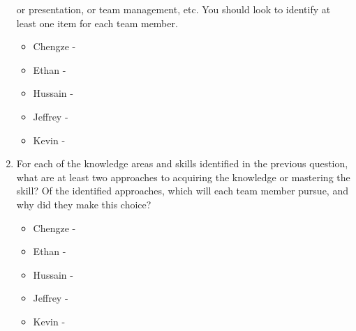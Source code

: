 \begin{enumerate}
  or presentation, or team management, etc.  You should look to identify at
  least one item for each team member.
  \begin{itemize}
        \item Chengze - 
        \item Ethan - 
        \item Hussain - 
        \item Jeffrey - 
        \item Kevin - 
  \end{itemize} 
  \item For each of the knowledge areas and skills identified in the previous
  question, what are at least two approaches to acquiring the knowledge or
  mastering the skill?  Of the identified approaches, which will each team
  member pursue, and why did they make this choice?
  \begin{itemize}
        \item Chengze - 
        \item Ethan - 
        \item Hussain - 
        \item Jeffrey - 
        \item Kevin - 
  \end{itemize} 
\end{enumerate}
